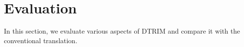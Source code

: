 \section{Evaluation}
\label{sec:evalation}

In this section, we evaluate various aspects of DTRIM and compare it with the conventional translation.

